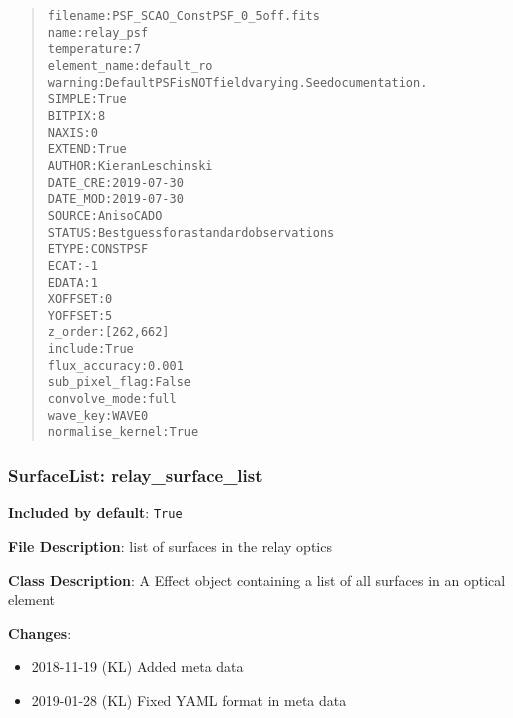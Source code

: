 \documentclass[a4paper]{article}
\begin{document}
\begin{quote}
\begin{alltt}
        filename : PSF_SCAO_ConstPSF_0_5off.fits
            name : relay_psf
     temperature : 7
    element_name : default_ro
         warning : Default PSF is NOT field varying. See documentation.
          SIMPLE : True
          BITPIX : 8
           NAXIS : 0
          EXTEND : True
          AUTHOR : Kieran Leschinski
        DATE_CRE : 2019-07-30
        DATE_MOD : 2019-07-30
          SOURCE : AnisoCADO
          STATUS : Best guess for a standard observations
           ETYPE : CONSTPSF
            ECAT : -1
           EDATA : 1
         XOFFSET : 0
         YOFFSET : 5
         z_order : [262, 662]
         include : True
   flux_accuracy : 0.001
  sub_pixel_flag : False
   convolve_mode : full
        wave_key : WAVE0
normalise_kernel : True
\end{alltt}
\end{quote}


\subsubsection{SurfaceList: \textquotedbl{}relay\_surface\_list\textquotedbl{}%
  \label{surfacelist-relay-surface-list}%
}

\textbf{Included by default}: \texttt{True}

\textbf{File Description}: list of surfaces in the relay optics

\textbf{Class Description}: A Effect object containing a list of all surfaces in an optical element

\textbf{Changes}:

\begin{itemize}
\item 2018-11-19 (KL) Added meta data

\item 2019-01-28 (KL) Fixed YAML format in meta data
\end{itemize}
\end{document}

